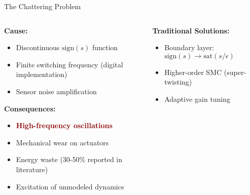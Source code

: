 \documentclass[10pt,aspectratio=169]{beamer}
\newcommand{\emphred}[1]{\textcolor{darkred}{\textbf{#1}}}
\begin{document}
\begin{frame}{The Chattering Problem}
\begin{columns}
\begin{column}{0.5\textwidth}
\textbf{Cause:}
\begin{itemize}
    \item Discontinuous $\text{sign}(s)$ function
    \item Finite switching frequency (digital implementation)
    \item Sensor noise amplification
\end{itemize}

\vspace{0.3cm}
\textbf{Consequences:}
\begin{itemize}
    \item \emphred{High-frequency oscillations}
    \item Mechanical wear on actuators
    \item Energy waste (30-50\% reported in literature)
    \item Excitation of unmodeled dynamics
\end{itemize}
\end{column}
\begin{column}{0.5\textwidth}
\begin{center}
\end{center}

\vspace{0.2cm}
\textbf{Traditional Solutions:}
\begin{itemize}
    \item Boundary layer: $\text{sign}(s) \rightarrow \text{sat}(s/\epsilon)$
    \item Higher-order SMC (super-twisting)
    \item Adaptive gain tuning
\end{itemize}
\end{column}
\end{columns}
\end{frame}
\end{document}
